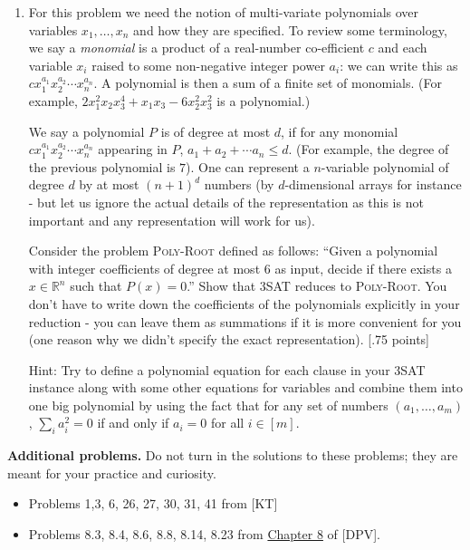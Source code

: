 \documentclass[11pt]{article}
\begin{document}
\begin{enumerate}
\item For this problem we need the notion of multi-variate polynomials over variables $x_1,\ldots,x_n$ and how they are specified. To review some terminology, we say a \emph{monomial} is a product of a real-number co-efficient $c$ and each variable $x_i$ raised to some non-negative integer power $a_i$: we can write this as $c x_1^{a_1} x_2^{a_2} \cdots x_n^{a_n}$. A polynomial is then a sum of a finite set of monomials. (For example, $2x_1^2 x_2 x_3^4 + x_1 x_3 - 6 x_2^2 x_3^2$ is a polynomial.)

We say a polynomial  $P$ is of degree at most $d$, if for any monomial $c x_1^{a_1} x_2^{a_2} \cdots x_n^{a_n}$ appearing in $P$, $a_1 + a_2 + \cdots a_n \leq d$. (For example, the degree of the previous polynomial is $7$). One can represent a $n$-variable polynomial of degree $d$ by at most $(n+1)^d$ numbers (by $d$-dimensional arrays for instance - but let us ignore the actual details of the representation as this is not important and any representation will work for us). 

Consider the problem \textsc{Poly-Root} defined as follows: ``Given a polynomial with integer coefficients of degree at most $6$ as input, decide if there exists a $x \in \mathbb{R}^n$ such that $P(x) = 0$.'' Show that 3SAT reduces to \textsc{Poly-Root}. You don't have to write down the coefficients of the polynomials explicitly in your reduction - you can leave them as summations if it is more convenient for you (one reason why we didn't specify the exact representation). [.75 points]

Hint: Try to define a polynomial equation for each clause in your 3SAT instance along with some other equations for variables and combine them into one big polynomial by using the fact that for any set of numbers $(a_1,\ldots,a_m)$, $\sum_i a_i^2 = 0$ if and only if $a_i = 0$ for all $i \in [m]$. 
\end{enumerate}

{\bf Additional problems.} Do not turn in the solutions to these problems; they are meant for your practice and curiosity.

\begin{itemize}
\item Problems 1,3, 6, 26, 27, 30, 31, 41 from [KT]
\item Problems 8.3, 8.4, 8.6, 8.8, 8.14, 8.23 from \href{https://people.eecs.berkeley.edu/~vazirani/algorithms/chap8.pdf}{Chapter 8} of [DPV].
\end{itemize}
\end{document}
